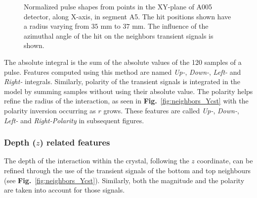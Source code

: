 \begin{figure}
\centering
{}
\caption{Normalized pulse shapes from points in the XY-plane
of A005 detector, along X-axis, in segment A5. The hit positions shown have a radius varying from $35$ mm to $37$ mm. The influence of the azimuthal angle of the hit on the neighbors transient signals is shown.}
\label{fig:neighbor_signals_RadCst}
\end{figure}

The absolute integral is the sum of the absolute values of the 120 samples of a pulse. Features computed using this method are named \textit{Up-}, \textit{Down-}, \textit{Left-} and \textit{Right-} integrals. Similarly, polarity of the transient signals is integrated in the model by summing samples without using their absolute value. The polarity helps refine the radius of the interaction, as seen in \textbf{Fig.}~\ref{fig:neighbors_Ycst} with the polarity inversion occurring as $r$ grows. These features are called \textit{Up-}, \textit{Down-}, \textit{Left-} and \textit{Right-Polarity} in subsequent figures.

\subsubsection{Depth ($z$) related features}
The depth of the interaction within the crystal, following the $z$ coordinate, can be refined through the use of the transient signals of the bottom and top neighbours (see \textbf{Fig.}~\ref{fig:neighbors_Ycst}). Similarly, both the magnitude and the polarity are taken into account for those signals.


